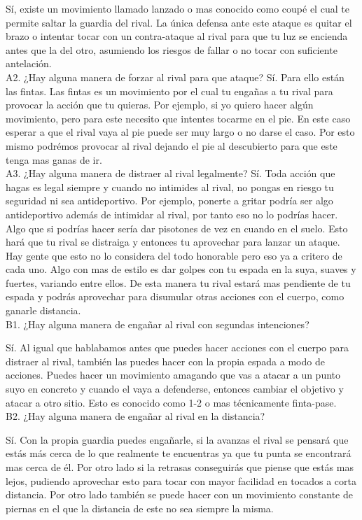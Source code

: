 Sí, existe un movimiento llamado lanzado o mas conocido como coupé el cual te permite saltar
la guardia del rival. La única defensa ante este ataque es quitar el brazo o intentar tocar
con un contra-ataque al rival para que tu luz se encienda antes que la del otro, asumiendo los
riesgos de fallar o no tocar con suficiente antelación.
\\


A2. ¿Hay alguna manera de forzar al rival para que ataque?
Sí. Para ello están las fintas. Las fintas es un movimiento por el cual tu engañas a tu rival
para provocar la acción que tu quieras. Por ejemplo, si yo quiero hacer algún movimiento, pero para
este necesito que intentes tocarme en el pie. En este caso esperar a que el rival vaya al pie
puede ser muy largo o no darse el caso. Por esto mismo podrémos provocar al rival dejando el pie
al descubierto para que este tenga mas ganas de ir.
\\


A3. ¿Hay alguna manera de distraer al rival legalmente?
Sí. Toda acción que hagas es legal siempre y cuando no intimides al rival, no pongas en riesgo tu
seguridad ni sea antideportivo. Por ejemplo, ponerte a gritar podría ser algo antideportivo además
de intimidar al rival, por tanto eso no lo podrías hacer. Algo que si podrías hacer sería dar pisotones
de vez en cuando en el suelo. Esto hará que tu rival se distraiga y entonces tu aprovechar para lanzar
un ataque. Hay gente que esto no lo considera del todo honorable pero eso ya a critero de cada uno.
Algo con mas de estilo es dar golpes con tu espada en la suya, suaves y fuertes, variando entre ellos.
De esta manera tu rival estará mas pendiente de tu espada y podrás aprovechar para disumular otras
acciones con el cuerpo, como ganarle distancia.
\\


B1. ¿Hay alguna manera de engañar al rival con segundas intenciones?

Sí. Al igual que hablabamos antes que puedes hacer acciones con el cuerpo para distraer al rival,
también las puedes hacer con la propia espada a modo de acciones. Puedes hacer un movimiento
amagando que vas a atacar a un punto suyo en concreto y cuando el vaya a defenderse, entonces
cambiar el objetivo y atacar a otro sitio. Esto es conocido como 1-2 o mas técnicamente finta-pase.
\\


B2. ¿Hay alguna manera de engañar al rival en la distancia?

Sí. Con la propia guardia puedes engañarle, si la avanzas el rival se pensará que estás más cerca
de lo que realmente te encuentras ya que tu punta se encontrará mas cerca de él. Por otro lado
si la retrasas conseguirás que piense que estás mas lejos, pudiendo aprovechar esto para tocar
con mayor facilidad en tocados a corta distancia. Por otro lado también se puede hacer con un
movimiento constante de piernas en el que la distancia de este no sea siempre la misma.
\\


